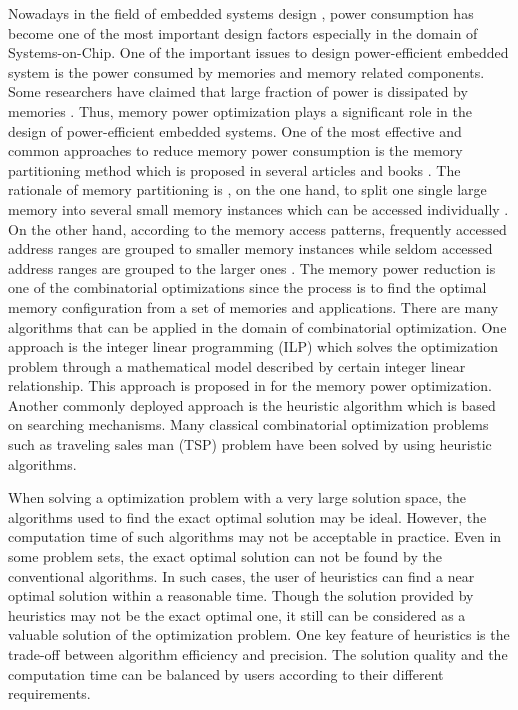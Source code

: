 \label{chap:introduction}
	Nowadays in the field of embedded systems design , power consumption has become one of the most important design factors especially in the domain of Systems-on-Chip. One of the important issues to design power-efficient embedded system is the power consumed by memories and memory related components. Some researchers have claimed that large fraction of power is dissipated by memories \cite{876761, 4415607}. Thus, memory power optimization plays a significant role in the design of power-efficient embedded systems.
	One of the most effective and common approaches to reduce memory power consumption is the memory partitioning method which is proposed in several articles and books \cite[p.43]{876761, Hiser:2005:EAP:1088093, macii2002memory}.
	The rationale of memory partitioning is , on the one hand, to split one single large memory into several small memory instances which can be accessed individually \cite{4415607}. On the other hand, according to the memory access patterns, frequently accessed address ranges are grouped to smaller memory instances while seldom accessed address ranges are grouped to the larger ones \cite{Strobel2016}.
	The memory power reduction is one of the combinatorial optimizations since the process is to find the optimal memory configuration from a set of memories and applications. There are many algorithms that can be applied in the domain of combinatorial optimization. One approach is the integer linear programming (ILP) which solves the optimization problem through a mathematical model described by certain integer linear relationship. This approach is proposed in \cite{Strobel2016} for the memory power optimization.
	Another commonly deployed approach is the heuristic algorithm which is based on searching mechanisms. Many classical combinatorial optimization
	problems such as traveling sales man (TSP) problem have been solved by using heuristic algorithms.
	
	When solving a optimization problem with a very large solution space, the algorithms used to find the exact optimal solution may be ideal. However, the computation time of such algorithms may not be acceptable in practice. Even in some problem sets, the exact optimal solution can not be found by the conventional algorithms. In such cases, the user of heuristics can find a near optimal solution within a reasonable
	time. Though the solution provided by heuristics may not be the exact optimal one, it still can be considered as a valuable solution of the optimization problem. One key feature of heuristics is the trade-off between algorithm efficiency and precision. The solution quality and the computation time can be balanced by users according to their different requirements.
	
